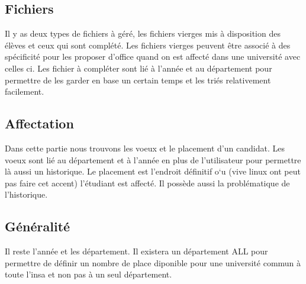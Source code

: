 \subsection{Fichiers}

Il y as deux types de fichiers à géré, les fichiers vierges mis à disposition des élèves et ceux qui sont complété.
Les fichiers vierges peuvent être associé à des spécificité pour les proposer d'office quand on est affecté dans une université avec celles ci.
Les fichier à compléter sont lié à l'année et au département pour permettre de les garder en base un certain temps et les triés relativement facilement.

\subsection{Affectation}

Dans cette partie nous trouvons les voeux et le placement d'un candidat. Les voeux sont lié au département et à l'année en plus de l'utilisateur pour permettre là aussi un historique.
Le placement est l'endroit définitif o`u (vive linux ont peut pas faire cet accent) l'étudiant est affecté. Il possède aussi la problématique de l'historique.

\subsection{Généralité}

Il reste l'année et les département. 
Il existera un département ALL pour permettre de définir un nombre de place diponible pour une université commun à toute l'insa et non pas à un seul département.


